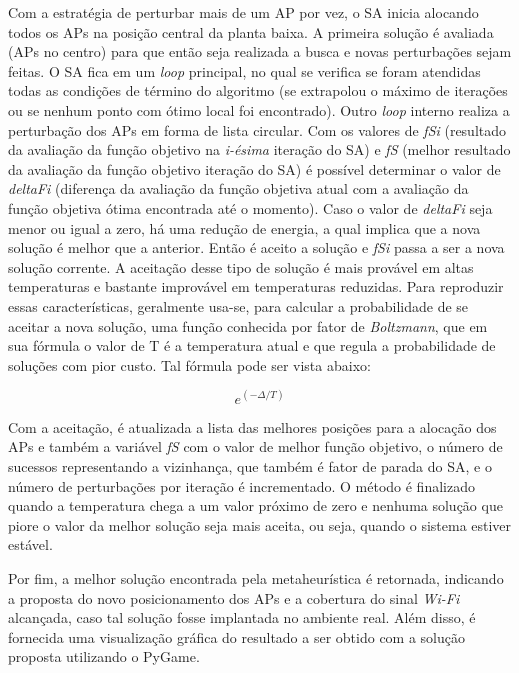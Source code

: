 \documentclass[
	12pt,				%
	openright,			%
	twoside,			%
	a4paper,			%
	english,			%
	french,				%
	spanish,			%
	brazil				%
	]{abntex2}
\begin{document}
Com a estratégia de perturbar mais de um AP por vez, o SA inicia alocando todos os APs na posição central da planta baixa. A primeira solução é avaliada (APs no centro) para que  então seja realizada a busca e novas perturbações sejam feitas. O SA fica em um \textit{loop} principal, no qual se verifica se foram atendidas todas as condições de término do algoritmo (se extrapolou o máximo de iterações ou se nenhum ponto com ótimo local foi encontrado).  Outro \textit{loop} interno realiza a perturbação dos APs em forma de lista circular. Com os valores de \textit{fSi} (resultado da avaliação da função objetivo na \textit{i-ésima} iteração do SA) e \textit{fS} (melhor resultado da avaliação da função objetivo iteração do SA) é possível determinar o valor de \textit{deltaFi} (diferença da avaliação da função objetiva atual com a avaliação da função objetiva ótima encontrada até o momento). Caso o valor de \textit{deltaFi} seja menor ou igual a zero, há uma redução de energia, a qual implica que a nova solução é melhor que a anterior. Então é aceito a solução e \textit{fSi} passa a ser a nova solução corrente. A aceitação desse tipo de solução é mais provável em altas temperaturas e bastante improvável em temperaturas reduzidas. Para reproduzir essas características, geralmente usa-se, para calcular a probabilidade de se aceitar a nova solução, uma função conhecida por fator de \textit{Boltzmann}, que em sua fórmula o valor de T é a temperatura atual e que regula a probabilidade de soluções com pior custo. Tal fórmula pode ser vista abaixo:

\begin{equation}
e^{(-\Delta/T)}
\end{equation}

Com a aceitação, é atualizada a lista das melhores posições para a alocação dos APs e também a variável \textit{fS} com o valor de melhor função objetivo, o número de sucessos representando a vizinhança, que também é fator de parada do SA, e o número de perturbações por iteração é incrementado. O método é finalizado quando a temperatura chega a um valor próximo de zero e nenhuma solução que piore o valor da melhor solução seja mais aceita, ou seja, quando o sistema estiver estável.

Por fim, a melhor solução encontrada pela metaheurística é retornada, indicando a proposta do novo posicionamento dos APs e a cobertura do sinal \textit{Wi-Fi} alcançada, caso tal solução fosse implantada no ambiente real. Além disso, é fornecida uma visualização gráfica do resultado a ser obtido com a solução proposta utilizando o PyGame.
\end{document}
